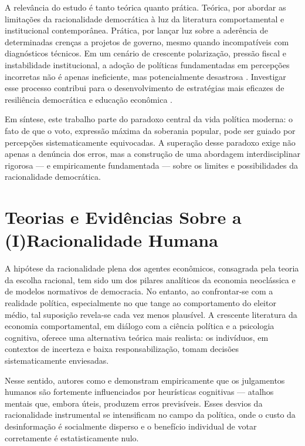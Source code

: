 A relevância do estudo é tanto teórica quanto prática. Teórica, por abordar as limitações da racionalidade democrática à luz da literatura comportamental e institucional contemporânea. Prática, por lançar luz sobre a aderência de determinadas crenças a projetos de governo, mesmo quando incompatíveis com diagnósticos técnicos. Em um cenário de crescente polarização, pressão fiscal e instabilidade institucional, a adoção de políticas fundamentadas em percepções incorretas não é apenas ineficiente, mas potencialmente desastrosa \cite{schumpeter1976capitalism,taleb2014antifragile}. Investigar esse processo contribui para o desenvolvimento de estratégias mais eficazes de resiliência democrática e educação econômica \cite{franco2022cartas,zaller1992nature}.

Em síntese, este trabalho parte do paradoxo central da vida política moderna: o fato de que o voto, expressão máxima da soberania popular, pode ser guiado por percepções sistematicamente equivocadas. A superação desse paradoxo exige não apenas a denúncia dos erros, mas a construção de uma abordagem interdisciplinar rigorosa — e empiricamente fundamentada — sobre os limites e possibilidades da racionalidade democrática.

\chapter{Teorias e Evidências Sobre a (I)Racionalidade Humana} %


A hipótese da racionalidade plena dos agentes econômicos, consagrada pela teoria da escolha racional, tem sido um dos pilares analíticos da economia neoclássica e de modelos normativos de democracia. No entanto, ao confrontar-se com a realidade política, especialmente no que tange ao comportamento do eleitor médio, tal suposição revela-se cada vez menos plausível. A crescente literatura da economia comportamental, em diálogo com a ciência política e a psicologia cognitiva, oferece uma alternativa teórica mais realista: os indivíduos, em contextos de incerteza e baixa responsabilização, tomam decisões sistematicamente enviesadas.

Nesse sentido, autores como  e  demonstram empiricamente que os julgamentos humanos são fortemente influenciados por heurísticas cognitivas — atalhos mentais que, embora úteis, produzem erros previsíveis. Esses desvios da racionalidade instrumental se intensificam no campo da política, onde o custo da desinformação é socialmente disperso e o benefício individual de votar corretamente é estatisticamente nulo.

